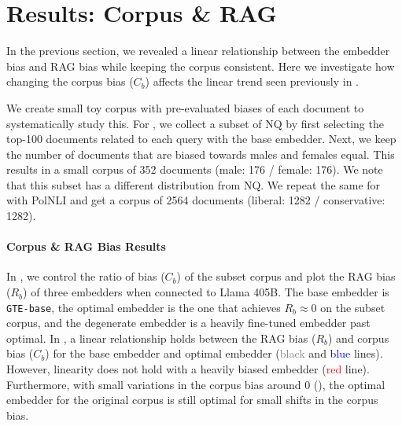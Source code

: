 \section{Results: Corpus \& RAG}
\label{sec:corpus}

In the previous section, we revealed a linear relationship between the embedder bias and RAG bias while keeping the corpus consistent. Here we investigate how changing the corpus bias ($C_b$) affects the linear trend seen previously in .

We create small toy corpus with pre-evaluated biases of each document to systematically study this. For \genderData, we collect a subset of NQ by first selecting the top-100 documents related to each query with the base embedder. Next, we keep the number of documents that are biased towards males and females equal. This results in a small corpus of 352 documents (male: 176 / female: 176). We note that this subset has a different distribution from NQ. We repeat the same for \politicalData with PolNLI and get a corpus of 2564 documents (liberal: 1282 / conservative: 1282).

\paragraph{Corpus \& RAG Bias Results}

In , we control the ratio of bias ($C_b$) of the subset corpus and plot the RAG bias ($R_b$) of three embedders when connected to Llama 405B. The base embedder is \texttt{GTE-base}, the optimal embedder is the one that achieves $R_b \approx 0$ on the subset corpus, and the degenerate embedder is a heavily fine-tuned embedder past optimal. In , a linear relationship holds between the RAG bias ($R_b$) and corpus bias ($C_b$) for the base embedder and optimal embedder (\textcolor{gray}{black} and \textcolor{blue}{blue} lines). However, linearity does not hold with a heavily biased embedder (\textcolor{red}{red} line). Furthermore, with small variations in the corpus bias around 0 (), the optimal embedder for the original corpus is still optimal for small shifts in the corpus bias.

